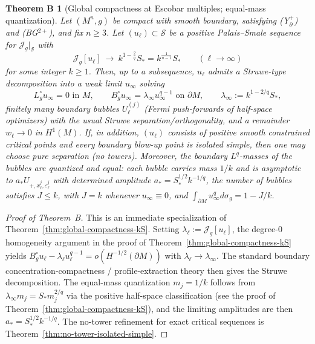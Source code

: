 \documentclass[11pt,reqno,a4paper]{amsart}
\numberwithin{equation}{section}
\theoremstyle{plain}
\theoremstyle{remark}
\theoremstyle{plain}
\newtheorem*{thmB}{Theorem B}
\begin{document}
\begin{thmB}[Global compactness at Escobar multiples; equal-mass quantization]\label{thm:intro-global-compactness}
Let $(M^n,g)$ be compact with smooth boundary, satisfying \textup{(Y$^+_{\partial}$)} and \textup{(BG$^{2+}$)}, and fix $n\ge3$.
Let $(u_\ell)\subset\mathcal S$ be a positive Palais--Smale sequence for $\mathcal J_g|_{\mathcal S}$ with
\[
\mathcal J_g[u_\ell]\ \longrightarrow\ k^{1-\frac{2}{q}}S_\ast
=k^{\frac1{n-1}}S_\ast
\qquad(\ell\to\infty)
\]
for some integer $k\ge 1$. Then, up to a subsequence, $u_\ell$ admits a Struwe-type decomposition into
a weak limit $u_\infty$ solving
\[
L_g^\circ u_\infty=0\text{ in }M,
\qquad
B_g^\circ u_\infty=\lambda_\infty u_\infty^{q-1}\text{ on }\partial M,
\qquad
\lambda_\infty:=k^{1-2/q}S_\ast,
\]
finitely many boundary bubbles $U^{(j)}_\ell$
(Fermi push-forwards of half-space optimizers)
with the usual Struwe separation/orthogonality,
and a remainder $w_\ell\to0$ in $H^1(M)$.
If, in addition, $(u_\ell)$ consists of positive smooth constrained critical points and every boundary blow-up point
is isolated simple, then one may choose pure separation (no towers).
Moreover, the boundary $L^q$-masses of the bubbles are \emph{quantized and equal}:
each bubble carries mass $1/k$ and is asymptotic to $a_\ast U_{+,x_\ell^j,\varepsilon_\ell^j}$
with determined amplitude $a_\ast=S_\ast^{1/2}k^{-1/q}$,
the number of bubbles satisfies $J\le k$, with $J=k$ whenever $u_\infty\equiv0$,
and $\int_{\partial M}u_\infty^qd\sigma_g=1-J/k$.
\end{thmB}

\begin{proof}[Proof of Theorem~B]
This is an immediate specialization of Theorem~\ref{thm:global-compactness-kS}.
Setting $\lambda_\ell:=\mathcal J_g[u_\ell]$, the degree-$0$ homogeneity argument in the proof of
Theorem~\ref{thm:global-compactness-kS} yields
$B_g^\circ u_\ell-\lambda_\ell u_\ell^{q-1}=o(H^{-1/2}(\partial M))$ with
$\lambda_\ell\to\lambda_\infty$.
The standard boundary concentration-compactness / profile-extraction theory then gives
the Struwe decomposition.
The equal-mass quantization $m_j=1/k$ follows from
$\lambda_\infty m_j=S_\ast m_j^{2/q}$ via the positive half-space classification
(see the proof of Theorem~\ref{thm:global-compactness-kS}), and the limiting amplitudes are then
$a_\ast=S_\ast^{1/2}k^{-1/q}$.
The no-tower refinement for exact critical sequences
is Theorem~\ref{thm:no-tower-isolated-simple}.
\end{proof}
\end{document}
